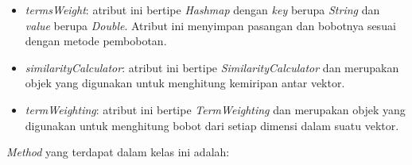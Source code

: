 \begin{itemize}
	\item \textit{termsWeight}: atribut ini bertipe \textit{Hashmap} dengan \textit{key} berupa \textit{String} dan \textit{value} berupa \textit{Double}. Atribut ini menyimpan pasangan \term dan bobotnya sesuai dengan metode pembobotan.
	\item \textit{similarityCalculator}: atribut ini bertipe \textit{SimilarityCalculator} dan merupakan objek yang digunakan untuk menghitung kemiripan antar vektor.
	\item \textit{termWeighting}: atribut ini bertipe \textit{TermWeighting} dan merupakan objek yang digunakan untuk menghitung bobot dari setiap dimensi dalam suatu vektor.
\end{itemize}

\textit{Method} yang terdapat dalam kelas ini adalah:

